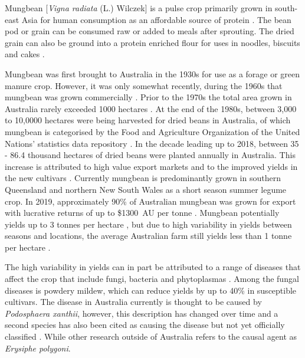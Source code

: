 \documentclass[agronomy,article,submit,moreauthors,pdftex]{mdpi}
\begin{document}

Mungbean {[}\emph{Vigna radiata} (L.) Wilczek{]} is a pulse crop primarily grown in south-east Asia for human consumption as an affordable source of protein \citep{Lambrides2007}.
The bean pod or grain can be consumed raw or added to meals after sprouting.
The dried grain can also be ground into a protein enriched flour for uses in noodles, biscuits and cakes \citep{Chankaew2013}.

Mungbean was first brought to Australia in the 1930s for use as a forage or green manure crop.
However, it was only somewhat recently, during the 1960s that mungbean was grown commercially \citep{Lawn1978, Chauhan2018}.
Prior to the 1970s the total area grown in Australia rarely exceeded 1000 hectares \citep{Lawn1978}.
At the end of the 1980s, between 3,000 to 10,0000 hectares were being harvested for dried beans in Australia, of which mungbean is categorised by the Food and Agriculture Organization of the United Nations' statistics data repository \citep{FAOSTAT}.
In the decade leading up to 2018, between 35 - 86.4 thousand hectares of dried beans were planted annually in Australia.
This increase is attributed to high value export markets and to the improved yields in the new cultivars \citep{Clarry2016}.
Currently mungbean is predominantly grown in southern Queensland and northern New South Wales as a short season summer legume crop.
In 2019, approximately 90\% of Australian mungbean was grown for export with lucrative returns of up to \$1300~AU per tonne \citep{QueenslandGovernment2019}.
Mungbean potentially yields up to 3 tonnes per hectare \citep{ThomasRobert2004}, but due to high variability in yields between seasons and locations, the average Australian farm still yields less than 1 tonne per hectare \citep{Chauhan2018}.

The high variability in yields can in part be attributed to a range of diseases that affect the crop that include fungi, bacteria and phytoplasmas \citep{Wood1990, Conde1991, Thakur1995, Fuhlbohm1996, Fuhlbohm2013, Wilson2001, Noble2019}.
Among the fungal diseases is powdery mildew, which can reduce yields by up to 40\% \citep{Chankaew2013} in susceptible cultivars.
The disease in Australia currently is thought to be caused by \emph{Podosphaera xanthii}, however, this description has changed over time and a second species has also been cited as causing the disease but not yet officially classified \citep{Kelly2019}.
While other research outside of Australia refers to the causal agent as \emph{Erysiphe polygoni}.
\end{document}
